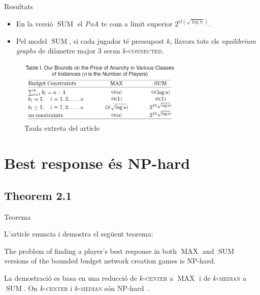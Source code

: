 \documentclass[aspectratio=169,handout]{beamer}
\DeclareMathOperator{\SUM}{SUM}
\DeclareMathOperator{\MAX}{MAX}
\newcommand{\kcenter}{\texorpdfstring{$k$}{k}-\textsc{center}\xspace}
\newcommand{\kmedian}{\texorpdfstring{$k$}{k}-\textsc{median}\xspace}
\begin{document}
\begin{frame}{Resultats}
\begin{itemize}[<+->] 
    
    \item En la versió $\SUM$ el \emph{PoA} te com a límit superior $2^{O(\sqrt{\log n})}$.

    \vspace{1em}
    
    \item Pel model $\SUM$, si cada jugador té pressupost $k$, llavors tots els \emph{equilibrium graphs} de diàmetre major $3$ seran $k$-\textsc{connected}.
    
\end{itemize} 

    \begin{figure}
    \centering
    \includegraphics[width=0.7\textwidth]{Table1_PoA_Bounds}
    \caption{Taula extreta del article \cite{ehsani_bounded_2015}}
    \end{figure}
\end{frame}

\section{Best response és NP-hard}
\subsection{Theorem 2.1}
\begin{frame}{Teorema}

    L'article enuncia i demostra el següent teorema:
    
    \begin{theorem}
    The problem of finding a player's best response in both $\MAX$ and $\SUM$ versions of the bounded
    budget network creation games is NP-hard.
    \end{theorem}
    
    \vspace{2em}
    
    La demostració es basa en una reducció de \kcenter a $\MAX$ i de \kmedian a $\SUM$.
    On \kcenter i \kmedian són 
    NP-hard~\cite{hsu_easy_1979,lin_e-approximations_1992,megiddo_complexity_1984}.
    
\end{frame}
\end{document}
